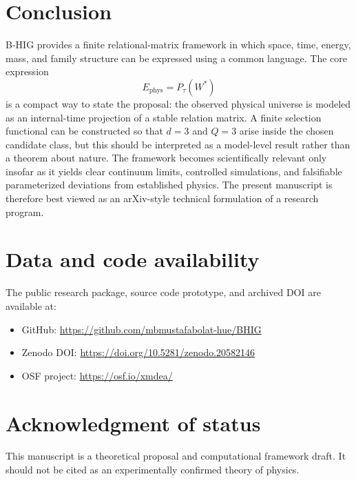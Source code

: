 \documentclass[11pt,a4paper]{article}
\newcommand{\BHIG}{B-HIG}
\newcommand{\Wstar}{W^{\ast}}
\newcommand{\Ephys}{E_{\mathrm{phys}}}
\begin{document}
\section{Conclusion}
\BHIG{} provides a finite relational-matrix framework in which space, time, energy, mass, and family structure can be expressed using a common language. The core expression
\[
\boxed{\Ephys=P_{\tau}(\Wstar)}
\]
is a compact way to state the proposal: the observed physical universe is modeled as an internal-time projection of a stable relation matrix. A finite selection functional can be constructed so that $d=3$ and $Q=3$ arise inside the chosen candidate class, but this should be interpreted as a model-level result rather than a theorem about nature. The framework becomes scientifically relevant only insofar as it yields clear continuum limits, controlled simulations, and falsifiable parameterized deviations from established physics. The present manuscript is therefore best viewed as an arXiv-style technical formulation of a research program.

\section*{Data and code availability}
The public research package, source code prototype, and archived DOI are available at:
\begin{itemize}
\item GitHub: \url{https://github.com/mbmustafabolat-hue/BHIG}
\item Zenodo DOI: \url{https://doi.org/10.5281/zenodo.20582146}
\item OSF project: \url{https://osf.io/xmdea/}
\end{itemize}

\section*{Acknowledgment of status}
This manuscript is a theoretical proposal and computational framework draft. It should not be cited as an experimentally confirmed theory of physics.
\end{document}
